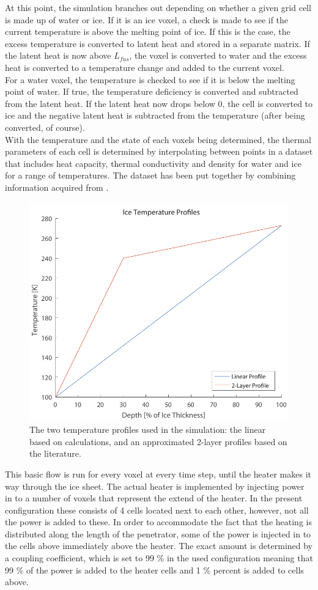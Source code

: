 \noindent
At this point, the simulation branches out depending on whether a given grid cell is made up of water or ice. If it is an ice voxel, a check is made to see if the current temperature is above the melting point of ice. If this is the case, the excess temperature is converted to latent heat and stored in a separate matrix. If the latent heat is now above $L_{fus}$, the voxel is converted to water and the excess heat is converted to a temperature change and added to the current voxel.\\

\noindent
For a water voxel, the temperature is checked to see if it is below the melting point of water. If true, the temperature deficiency is converted and subtracted from the latent heat. If the latent heat now drops below 0, the cell is converted to ice and the negative latent heat is subtracted from the temperature (after being converted, of course).\\

\noindent
With the temperature and the state of each voxels being determined, the thermal parameters of each cell is determined by interpolating between points in a dataset that includes heat capacity, thermal conductivity and density for water and ice for a range of temperatures. The dataset has been put together by combining information acquired from \cite{website:engineeringToolbox}.\\

\begin{figure}[ht]
	\centering
	\includegraphics[width=.5\textwidth]{figures/LAMC/iceTempProfiles.pdf}
	\caption{The two temperature profiles used in the simulation: the linear based on calculations, and an approximated 2-layer profiles based on the literature.}
	\label{fig:iceTempProfiles}
\end{figure}

\noindent
This basic flow is run for every voxel at every time step, until the heater makes it way through the ice sheet. The actual heater is implemented by injecting power in to a number of voxels that represent the extend of the heater. In the present configuration these consists of 4 cells located next to each other, however, not all the power is added to these. In order to accommodate the fact that the heating is distributed along the length of the penetrator, some of the power is injected in to the cells above immediately above the heater. The exact amount is determined by a coupling coefficient, which is set to 99 \% in the used configuration meaning that 99 \% of the power is added to the heater cells and 1 \% percent is added to cells above. \\


